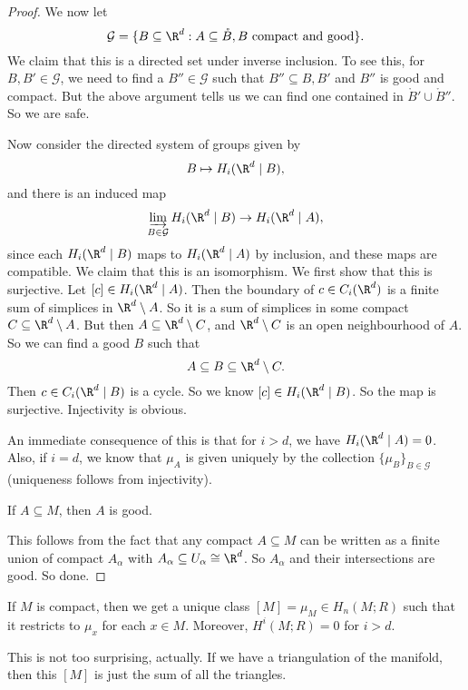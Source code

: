 \documentclass[a4paper]{article}
\theoremstyle{definition}
\begin{document}
\begin{proof}
  We now let
  \[
    \mathcal{G} = \{B \subseteq \R^d: A \subseteq \mathring{B}, B\text{ compact and good}\}.
  \]
  We claim that this is a directed set under inverse inclusion. To see this, for $B, B' \in \mathcal{G}$, we need to find a $B'' \in \mathcal{G}$ such that $B'' \subseteq B, B'$ and $B''$ is good and compact. But the above argument tells us we can find one contained in $\mathring{B}' \cup \mathring{B}''$. So we are safe.

  Now consider the directed system of groups given by
  \[
    B \mapsto H_i(\R^d \mid B),
  \]
  and there is an induced map
  \[
    \varinjlim_{B \in \mathcal{G}} H_i(\R^d \mid B) \to H_i(\R^d \mid A),
  \]
  since each $H_i(\R^d \mid B)$ maps to $H_i(\R^d \mid A)$ by inclusion, and these maps are compatible. We claim that this is an isomorphism. We first show that this is surjective. Let $[c] \in H_i(\R^d \mid A)$. Then the boundary of $c \in C_i(\R^d)$ is a finite sum of simplices in $\R^d \setminus A$. So it is a sum of simplices in some compact $C \subseteq \R^d \setminus A$. But then $A \subseteq \R^d \setminus C$, and $\R^d \setminus C$ is an open neighbourhood of $A$. So we can find a good $B$ such that
  \[
    A \subseteq B \subseteq \R^d \setminus C.
  \]
  Then $c \in C_i(\R^d \mid B)$ is a cycle. So we know $[c] \in H_i(\R^d \mid B)$. So the map is surjective. Injectivity is obvious.

  An immediate consequence of this is that for $i > d$, we have $H_i(\R^d \mid A) = 0$. Also, if $i = d$, we know that $\mu_A$ is given uniquely by the collection $\{\mu_B\}_{B \in \mathcal{G}}$ (uniqueness follows from injectivity).

  \begin{claim}
    If $A \subseteq M$, then $A$ is good.
  \end{claim}
  This follows from the fact that any compact $A \subseteq M$ can be written as a finite union of compact $A_\alpha$ with $A_\alpha \subseteq U_\alpha \cong \R^d$. So $A_\alpha$ and their intersections are good. So done.
\end{proof}

\begin{cor}
  If $M$ is compact, then we get a unique class $[M] = \mu_M \in H_n(M; R)$ such that it restricts to $\mu_x$ for each $x \in M$. Moreover, $H^i(M; R) = 0$ for $i > d$.
\end{cor}
This is not too surprising, actually. If we have a triangulation of the manifold, then this $[M]$ is just the sum of all the triangles.
\end{document}
